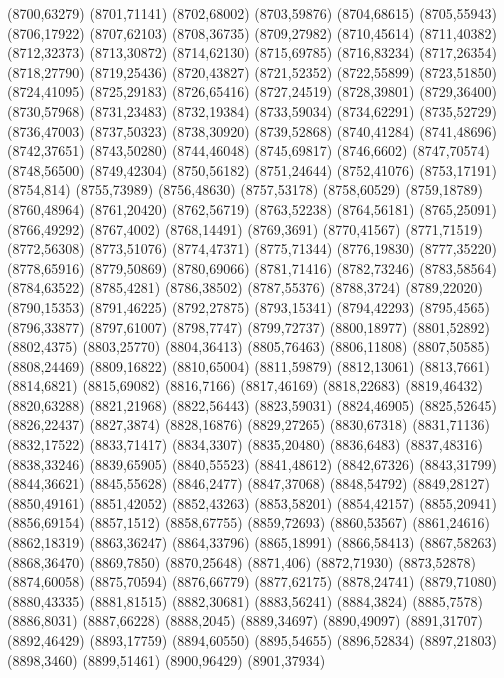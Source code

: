 (8700,63279)
(8701,71141)
(8702,68002)
(8703,59876)
(8704,68615)
(8705,55943)
(8706,17922)
(8707,62103)
(8708,36735)
(8709,27982)
(8710,45614)
(8711,40382)
(8712,32373)
(8713,30872)
(8714,62130)
(8715,69785)
(8716,83234)
(8717,26354)
(8718,27790)
(8719,25436)
(8720,43827)
(8721,52352)
(8722,55899)
(8723,51850)
(8724,41095)
(8725,29183)
(8726,65416)
(8727,24519)
(8728,39801)
(8729,36400)
(8730,57968)
(8731,23483)
(8732,19384)
(8733,59034)
(8734,62291)
(8735,52729)
(8736,47003)
(8737,50323)
(8738,30920)
(8739,52868)
(8740,41284)
(8741,48696)
(8742,37651)
(8743,50280)
(8744,46048)
(8745,69817)
(8746,6602)
(8747,70574)
(8748,56500)
(8749,42304)
(8750,56182)
(8751,24644)
(8752,41076)
(8753,17191)
(8754,814)
(8755,73989)
(8756,48630)
(8757,53178)
(8758,60529)
(8759,18789)
(8760,48964)
(8761,20420)
(8762,56719)
(8763,52238)
(8764,56181)
(8765,25091)
(8766,49292)
(8767,4002)
(8768,14491)
(8769,3691)
(8770,41567)
(8771,71519)
(8772,56308)
(8773,51076)
(8774,47371)
(8775,71344)
(8776,19830)
(8777,35220)
(8778,65916)
(8779,50869)
(8780,69066)
(8781,71416)
(8782,73246)
(8783,58564)
(8784,63522)
(8785,4281)
(8786,38502)
(8787,55376)
(8788,3724)
(8789,22020)
(8790,15353)
(8791,46225)
(8792,27875)
(8793,15341)
(8794,42293)
(8795,4565)
(8796,33877)
(8797,61007)
(8798,7747)
(8799,72737)
(8800,18977)
(8801,52892)
(8802,4375)
(8803,25770)
(8804,36413)
(8805,76463)
(8806,11808)
(8807,50585)
(8808,24469)
(8809,16822)
(8810,65004)
(8811,59879)
(8812,13061)
(8813,7661)
(8814,6821)
(8815,69082)
(8816,7166)
(8817,46169)
(8818,22683)
(8819,46432)
(8820,63288)
(8821,21968)
(8822,56443)
(8823,59031)
(8824,46905)
(8825,52645)
(8826,22437)
(8827,3874)
(8828,16876)
(8829,27265)
(8830,67318)
(8831,71136)
(8832,17522)
(8833,71417)
(8834,3307)
(8835,20480)
(8836,6483)
(8837,48316)
(8838,33246)
(8839,65905)
(8840,55523)
(8841,48612)
(8842,67326)
(8843,31799)
(8844,36621)
(8845,55628)
(8846,2477)
(8847,37068)
(8848,54792)
(8849,28127)
(8850,49161)
(8851,42052)
(8852,43263)
(8853,58201)
(8854,42157)
(8855,20941)
(8856,69154)
(8857,1512)
(8858,67755)
(8859,72693)
(8860,53567)
(8861,24616)
(8862,18319)
(8863,36247)
(8864,33796)
(8865,18991)
(8866,58413)
(8867,58263)
(8868,36470)
(8869,7850)
(8870,25648)
(8871,406)
(8872,71930)
(8873,52878)
(8874,60058)
(8875,70594)
(8876,66779)
(8877,62175)
(8878,24741)
(8879,71080)
(8880,43335)
(8881,81515)
(8882,30681)
(8883,56241)
(8884,3824)
(8885,7578)
(8886,8031)
(8887,66228)
(8888,2045)
(8889,34697)
(8890,49097)
(8891,31707)
(8892,46429)
(8893,17759)
(8894,60550)
(8895,54655)
(8896,52834)
(8897,21803)
(8898,3460)
(8899,51461)
(8900,96429)
(8901,37934)
